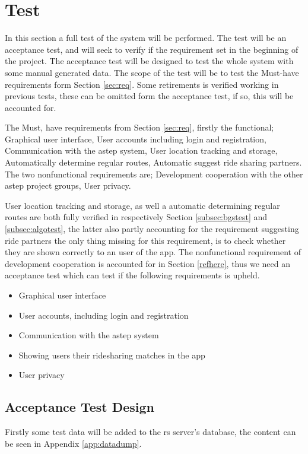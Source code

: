 \section{Test}
In this section a full test of the system will be performed.
The test will be an acceptance test, and will seek to verify if the requirement set in the beginning of the project.
The acceptance test will be designed to test the whole system with some manual generated data.
The scope of the test will be to test the Must-have requirements form Section \ref{sec:req}.
Some retirements is verified working in previous tests, these can be omitted form the acceptance test, if so, this will be accounted for. 

The Must, have requirements from Section \ref{sec:req}, firstly the functional; Graphical user interface, User accounts including login and registration, Communication with the \gls{astep} system, User location tracking and storage, Automatically determine regular routes, Automatic suggest ride sharing partners. The two nonfunctional requirements are; Development cooperation with the other \gls{astep} project groups, User privacy.

User location tracking and storage, as well a automatic determining regular routes are both fully verified in respectively Section \ref{subsec:bgstest} and \ref{subsec:algotest}, the latter also partly accounting for the requirement suggesting ride partners the only thing missing for this requirement, is to check whether they are shown correctly to an user of the app. 
The nonfunctional requirement of development cooperation is accounted for in Section \ref{refhere}, thus we need an acceptance test which can test if the following requirements is upheld. 
\begin{itemize}
	\item Graphical user interface
	\item User accounts, including login and registration
	\item Communication with the \gls{astep} system
	\item Showing users their ridesharing matches in the app
	\item User privacy
\end{itemize}

\subsection{Acceptance Test Design}
Firstly some test data will be added to the \gls{rs} server's database, the content can be seen in Appendix \ref{app:datadump}.

